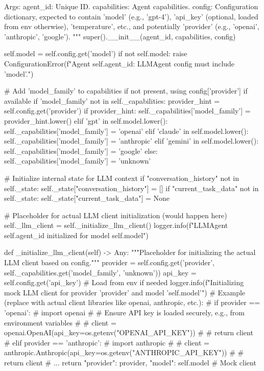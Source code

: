 \documentclass{amsbook}
\theoremstyle{definition}
\theoremstyle{remark}
\numberwithin{equation}{chapter} %
\begin{document}
\begin{python}
        Args:
            agent_id: Unique ID.
            capabilities: Agent capabilities.
            config: Configuration dictionary, expected to contain 'model' (e.g., 'gpt-4'),
                    'api_key' (optional, loaded from env otherwise), 'temperature', etc.,
                    and potentially 'provider' (e.g., 'openai', 'anthropic', 'google').
        """
        super().__init__(agent_id, capabilities, config)

        self.model = self.config.get('model')
        if not self.model:
            raise ConfigurationError(f"Agent {self.agent_id}: LLMAgent config must include 'model'.")

        # Add 'model_family' to capabilities if not present, using config['provider'] if available
        if 'model_family' not in self._capabilities:
             provider_hint = self.config.get('provider')
             if provider_hint:
                 self._capabilities['model_family'] = provider_hint.lower()
             elif 'gpt' in self.model.lower(): self._capabilities['model_family'] = 'openai'
             elif 'claude' in self.model.lower(): self._capabilities['model_family'] = 'anthropic'
             elif 'gemini' in self.model.lower(): self._capabilities['model_family'] = 'google'
             else: self._capabilities['model_family'] = 'unknown'

        # Initialize internal state for LLM context
        if "conversation_history" not in self._state:
            self._state["conversation_history"] = []
        if "current_task_data" not in self._state:
             self._state["current_task_data"] = None

        # Placeholder for actual LLM client initialization (would happen here)
        self._llm_client = self._initialize_llm_client()
        logger.info(f"LLMAgent {self.agent_id} initialized for model {self.model}")

    def _initialize_llm_client(self) -> Any:
        """Placeholder for initializing the actual LLM client based on config."""
        provider = self.config.get('provider', self._capabilities.get('model_family', 'unknown'))
        api_key = self.config.get('api_key') # Load from env if needed
        logger.info(f"Initializing mock LLM client for provider '{provider}' and model '{self.model}'")
        # Example (replace with actual client libraries like openai, anthropic, etc.):
        # if provider == 'openai':
        #     import openai
        #     # Ensure API key is loaded securely, e.g., from environment variables
        #     # client = openai.OpenAI(api_key=os.getenv("OPENAI_API_KEY"))
        #     # return client
        # elif provider == 'anthropic':
        #     import anthropic
        #     # client = anthropic.Anthropic(api_key=os.getenv("ANTHROPIC_API_KEY"))
        #     # return client
        # ...
        return {"provider": provider, "model": self.model} # Mock client


\end{python}
\end{document}
